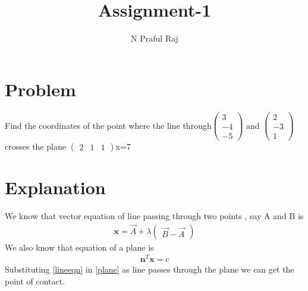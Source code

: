 \documentclass[10pt,a4paper,twocolumn]{article}
\author{N Praful Raj}
\title{\textbf{Assignment-1}}
\numberwithin{equation}{section}
\begin{document}
\maketitle



	
\section{Problem}
Find the coordinates of the point where the line through$\begin{pmatrix}3 \\-4 \\-5\end{pmatrix}$ and $\begin{pmatrix}2 \\-3 \\1\end{pmatrix}$ crosses the plane $\begin{pmatrix}2 & 1 & 1\end{pmatrix}$x=7 

\section{Explanation}\label{exp}
We know that vector equation of line passing through two points , say A and B is
\begin{gather}\label{lineeqn}\textbf{x} = \vec{A}+\lambda\begin{pmatrix}\vec{B}-\vec{A}\end{pmatrix}
\end{gather}
We also know that equation of a plane is \begin{gather}\label{plane}\textbf{n}^T\textbf{x}=c\end{gather}
Substituting \ref{lineeqn} in \ref{plane} as line passes through the plane we can get the point of contact.
\end{document}
